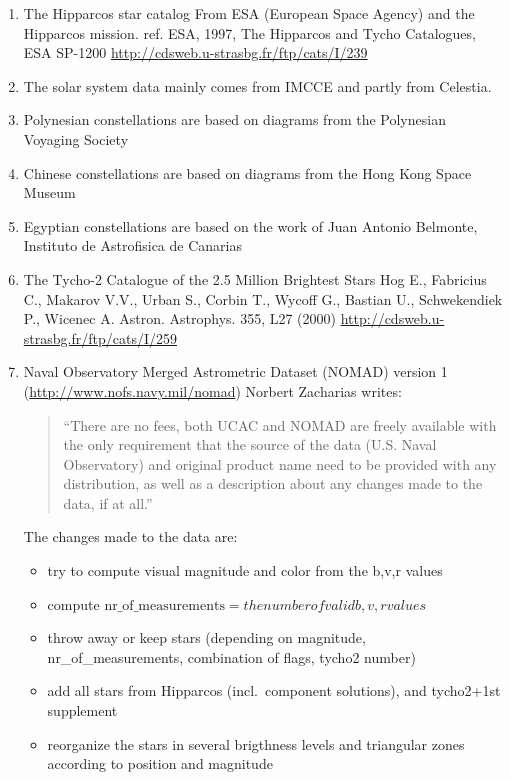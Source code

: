 \begin{enumerate}
\item The Hipparcos star catalog
    From ESA (European Space Agency) and the Hipparcos mission. ref. ESA, 1997, The Hipparcos and Tycho Catalogues, ESA SP-1200 \url{http://cdsweb.u-strasbg.fr/ftp/cats/I/239}
\item The solar system data mainly comes from IMCCE and partly from Celestia.
\item Polynesian constellations are based on diagrams from the Polynesian Voyaging Society
\item Chinese constellations are based on diagrams from the Hong Kong Space Museum
\item Egyptian constellations are based on the work of Juan Antonio Belmonte, Instituto de Astrofisica de Canarias
\item The Tycho-2 Catalogue of the 2.5 Million Brightest Stars Hog E., Fabricius C., Makarov V.V., Urban S., Corbin T., Wycoff G., Bastian U., Schwekendiek P., Wicenec A.
    Astron. Astrophys. 355, L27 (2000)
    \url{http://cdsweb.u-strasbg.fr/ftp/cats/I/259}
\item Naval Observatory Merged Astrometric Dataset (NOMAD) version 1 (\url{http://www.nofs.navy.mil/nomad})
    Norbert Zacharias writes:
	\begin{quotation}
    ``There are no fees, both UCAC and NOMAD are freely available with the only requirement that the source of the data (U.S.
    Naval Observatory) and original product name need to be provided with any distribution, as well as a description about any
    changes made to the data, if at all.''
	\end{quotation}
    The changes made to the data are:
	\begin{itemize}
    \item try to compute visual magnitude and color from the b,v,r values
    \item compute $\mathrm{nr\_of\_measurements} = the number of valid b,v,r values$
    \item throw away or keep stars (depending on magnitude, nr\_of\_measurements, combination of flags, tycho2 number)
    \item add all stars from Hipparcos (incl.\ component solutions), and tycho2+1st supplement
    \item reorganize the stars in several brigthness levels and triangular zones according to position and magnitude

\end{itemize}
\end{enumerate}
